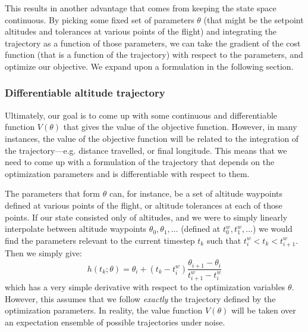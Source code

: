 \documentclass[11pt]{scrartcl} %
\begin{document}
This results in another advantage that comes from keeping the state space continuous. By picking some fixed set of parameters $\theta$ (that might be the setpoint altitudes and tolerances at various points of the flight) and integrating the trajectory as a function of those parameters, we can take the gradient of the cost function (that is a function of the trajectory) with respect to the parameters, and optimize our objective. We expand upon a formulation in the following section.

\subsubsection{Differentiable altitude trajectory}
Ultimately, our goal is to come up with some continuous and differentiable function $V(\theta)$ that gives the value of the objective function. However, in many instances, the value of the objective function will be related to the integration of the trajectory---e.g. distance travelled, or final longitude. This means that we need to come up with a formulation of the trajectory that depends on the optimization parameters and is differentiable with respect to them.

The parameters that form $\theta$ can, for instance, be a set of altitude waypoints defined at various points of the flight, or altitude tolerances at each of those points. If our state consisted only of altitudes, and we were to simply linearly interpolate between altitude waypoints $\theta_0, \theta_1, \dots$ (defined at $t^w_0, t^w_1, \dots$) we would find the parameters relevant to the current timestep $t_k$ such that $t^w_i < t_k < t^w_{i+1}$. Then we simply give:
\[h(t_k; \theta) = \theta_i + (t_k - t_i^w) \frac{\theta_{i+1}-\theta_i}{t_{i+1}^w - t^w_i}\]
which has a very simple derivative with respect to the optimization variables $\theta$. However, this assumes that we follow \emph{exactly} the trajectory defined by the optimization parameters. In reality, the value function $V(\theta)$ will be taken over an expectation ensemble of possible trajectories under noise.
\end{document}
